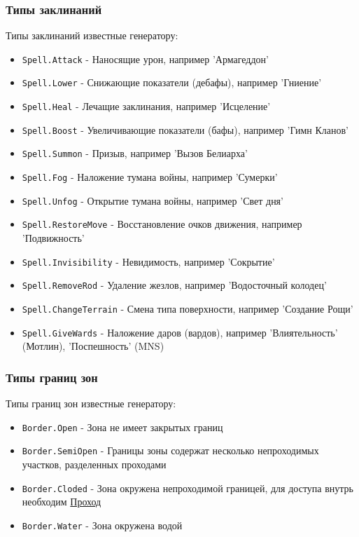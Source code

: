 \subsubsection{Типы заклинаний}
\label{spellTypes}
Типы заклинаний известные генератору:
\begin{itemize}
\item \texttt{Spell.Attack} - Наносящие урон, например 'Армагеддон'
\item \texttt{Spell.Lower} - Снижающие показатели (дебафы), например 'Гниение'
\item \texttt{Spell.Heal} - Лечащие заклинания, например 'Исцеление'
\item \texttt{Spell.Boost} - Увеличивающие показатели (бафы), например 'Гимн Кланов'
\item \texttt{Spell.Summon} - Призыв, например 'Вызов Белиарха'
\item \texttt{Spell.Fog} - Наложение тумана войны, например 'Сумерки'
\item \texttt{Spell.Unfog} - Открытие тумана войны, например 'Свет дня'
\item \texttt{Spell.RestoreMove} - Восстановление очков движения, например 'Подвижность'
\item \texttt{Spell.Invisibility} - Невидимость, например 'Сокрытие'
\item \texttt{Spell.RemoveRod} - Удаление жезлов, например 'Водосточный колодец'
\item \texttt{Spell.ChangeTerrain} - Смена типа поверхности, например 'Создание Рощи'
\item \texttt{Spell.GiveWards} - Наложение даров (вардов), например 'Влиятельность' (Мотлин), 'Поспешность' (MNS)
\end{itemize}

\subsubsection{Типы границ зон}
\label{borderTypes}
Типы границ зон известные генератору:
\begin{itemize}
\item \texttt{Border.Open} - Зона не имеет закрытых границ
\item \texttt{Border.SemiOpen} - Границы зоны содержат несколько непроходимых участков, разделенных проходами
\item \texttt{Border.Cloded} - Зона окружена непроходимой границей, для доступа внутрь необходим \hyperref[connection]{Проход}
\item \texttt{Border.Water} - Зона окружена водой
\end{itemize}